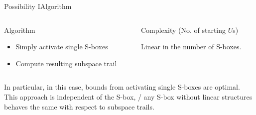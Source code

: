 \begin{frame}{Possibility I}{Algorithm}
    \begin{columns}[t,onlytextwidth]
        \begin{column}{0.5\textwidth}
            \begin{block}{Algorithm}
                \begin{minipage}[t][30pt][t]{\textwidth}
                \begin{itemize}
                    \item Simply activate single S-boxes
                    \item Compute resulting subspace trail
                \end{itemize}
                \end{minipage}
            \end{block}
        \end{column}
        \begin{column}{0.4\textwidth}
            \begin{block}{Complexity (No. of starting $U$s)}
                \begin{minipage}[t][30pt][t]{\textwidth}
                \vspace{2pt}
                Linear in the number of S-boxes.
                \end{minipage}
            \end{block}
        \end{column}
    \end{columns}
    \vspace{0.5em}
    In particular, in this case, bounds from activating single S-boxes are optimal.\\[1em]
    This approach is independent of the S-box, \ie/ any S-box without linear structures behaves the same with respect to subspace trails.
\end{frame}

